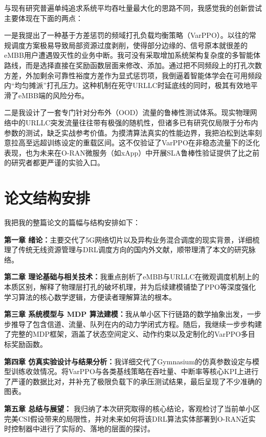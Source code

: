 与现有研究普遍单纯追求系统平均吞吐量最大化的思路不同，我感觉我的创新尝试主要体现在下面的两点：

一是我提出了一种基于方差惩罚的频域打孔负载均衡策略（VarPPO）。以往的常规调度方案极易导致局部资源过度剥削，使得部分边缘的、信号原本就很差的eMBB用户遭遇毁灭性的业务中断。我可没有采取增加系统架构复杂度的多智能体路线，而是选择直接在奖励函数层面来修改、添加。通过把不同频段上的打孔次数方差，外加剩余可靠性裕度方差作为显式惩罚项，我倒逼着智能体学会在可用频段内“均匀摊派”打孔压力。这种机制在死守URLLC时延底线的同时，极其有效地平滑了eMBB端的风险分布。

二是我设计了一套专门针对分布外（OOD）流量的鲁棒性测试体系。现实物理网络中的URLLC突发流量往往带有极强的随机性，但诸多已有研究仅局限于分布内参数的测试，缺乏实战参考价值。为摸清算法真实的性能边界，我把泊松到达率刻意拉高至远超训练设定的重载区间。这不仅验证了VarPPO在非稳态流量下的泛化表现，也为未来在O-RAN微服务（如xApp）中开展SLA鲁棒性验证提供了比之前的研究者都更严谨的实验入口。
\section{论文结构安排}\label{15-ux8bbaux6587ux7ed3ux6784ux5b89ux6392}



我把我的整篇论文的篇幅与结构安排如下：

\textbf{第一章 绪论：}主要交代了5G网络切片以及异构业务混合调度的现实背景，详细梳理了传统无线资源管理与DRL调度方向的国内外文献，顺带理清了本文的研究脉络。

\textbf{第二章 理论基础与相关技术：}我重点剖析了eMBB与URLLC在微观调度机制上的本质区别，解释了物理层打孔的破坏机理，并为后续建模铺垫了PPO等深度强化学习算法的核心数学逻辑，方便读者理解算法的根本。

\textbf{第三章 系统模型与 MDP 算法建模：}我从单小区下行链路的数学抽象出发，一步步推导了包含信道、流量、队列在内的动力学闭式方程。随后，我继续一步步构建了完整的MDP框架，涵盖了状态空间定义、动作约束以及定制化的VarPPO多目标奖励函数。

\textbf{第四章 仿真实验设计与结果分析：}我详细交代了Gymnasium的仿真参数设定与模型训练收敛情况。将VarPPO与各类基线策略在吞吐量、中断率等核心KPI上进行了严谨的数据比对，并补充了极限负载下的承压测试结果，最后呈现了不少准确的图表。

\textbf{第五章 总结与展望：} 我归纳了本次研究取得的核心结论，客观检讨了当前单小区完美CSI假设带来的局限性，并对未来如何将该DRL算法实体部署到O-RAN近实时控制器中进行了实际的、落地的层面的探讨。





